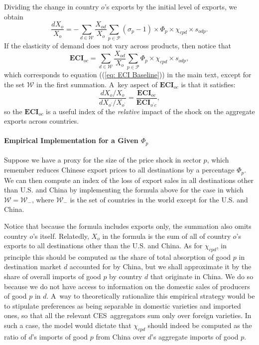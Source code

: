 \documentclass[english,12pt]{article}
\theoremstyle{definition}
\let\oldref\ref
\renewcommand{\ref}[1]{(\oldref{#1})}
\begin{document}
Dividing the change in country $o$'s exports by the initial level of
exports, we obtain%
\begin{equation*}
\frac{dX_{o}}{X_{o}}=-\sum_{d\in \mathcal{W}}\frac{X_{od}}{X_{o}}\sum_{p\in 
\mathcal{P}}(\sigma _{p}-1)\times \Phi _{p}\times \chi _{cpd}\times s_{odp}.
\end{equation*}%
If the elasticity of demand does not vary across products, then notice that 
\begin{equation}
\boldsymbol{ECI}_{oc}=\sum_{d\in \mathcal{W}}\frac{X_{od}}{X_{o}}\sum_{p\in 
\mathcal{P}}\Phi _{p}\times \chi _{cpd}\times s_{odp},
\label{eq: ECI Appendix}
\end{equation}%
which corresponds to equation (\ref{eq: ECI Baseline}) in the main text,
except for the set $\mathcal{W}$ in the first summation. A\ key aspect of $%
\boldsymbol{ECI}_{oc}$ is that it satisfies:%
\begin{equation*}
\frac{dX_{o}/X_{o}}{dX_{o^{\prime }}/X_{o^{\prime }}}=\frac{\boldsymbol{ECI}%
_{oc}}{\boldsymbol{ECI}_{o^{\prime }c}},
\end{equation*}%
so the $\boldsymbol{ECI}_{oc}$ is a useful index of the \emph{relative}
impact of the shock on the aggregate exports across countries.

\paragraph{Empirical Implementation for a Given $\Phi _{p}$}

Suppose we have a proxy for the size of the price shock in sector $p$, which
remember reduces Chinese export prices to all destinations by a percentage $%
\Phi _{p}$. We can then compute an index of the loss of export sales in all
destinations other than U.S. and China by implementing the formula above for
the case in which $\mathcal{W=W}_{-}$, where $\mathcal{W}_{-}$ is the set of
countries in the world except for the U.S. and China.

Notice that because the formula includes exports only, the summation also
omits country $o$'s itself. Relatedly, $X_{o}$ in the formula is the sum of
all of country $o$'s exports to all destinations other than the U.S. and
China. As for $\chi _{cpd}$, in principle this should be computed as the
share of total absorption of good $p$ in destination market $d$ accounted
for by China, but we shall approximate it by the share of overall imports of
good $p$ by country $d$ that originate in China. We do so because we do not
have access to information on the domestic sales of producers of good $p$ in 
$d$. A\ way to theoretically rationalize this empirical strategy would be to
stipulate preferences as being separable in domestic varieties and imported
ones, so that all the relevant CES\ aggregators sum only over foreign
varieties. In such a case, the model would dictate that $\chi _{cpd}$ should
indeed be computed as the ratio of $d$'s imports of good $p$ from China over 
$d$'s aggregate imports of good $p$.
\end{document}
